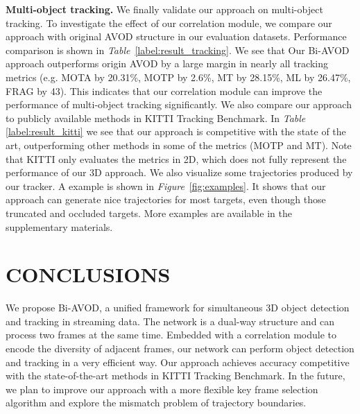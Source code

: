 \documentclass[letterpaper, 10 pt, conference]{ieeeconf}  %
\def\figurename{\emph{Figure}}
\def\tablename{\emph{Table}}
\begin{document}
\textbf{Multi-object tracking.} We finally validate our approach on multi-object tracking. To investigate the effect of our correlation module, we compare our approach with original AVOD structure in our evaluation datasets. Performance comparison is shown in  \tablename \, \ref{label:result_tracking}. We see that Our Bi-AVOD approach outperforms origin AVOD by a large margin in nearly all tracking metrics (e.g. MOTA by 20.31\%, MOTP by 2.6\%, MT by 28.15\%, ML by 26.47\%, FRAG by 43). This indicates that our correlation module can improve the performance of multi-object tracking significantly. We also compare our approach to publicly available methods in KITTI Tracking Benchmark. In \tablename \, \ref{label:result_kitti} we see that our approach is competitive with the state of the art, outperforming other methods in some of the metrics (MOTP and MT). Note that KITTI only evaluates the metrics in 2D, which does not fully represent the performance of our 3D approach.
We also visualize some trajectories produced by our tracker. A example is shown in \figurename \, \ref{fig:examples}. It shows that our approach can generate nice trajectories for most targets, even though those truncated and occluded targets. More examples are available in the supplementary materials. 


\section{CONCLUSIONS}

\label{sec:conclusions} We propose Bi-AVOD, a unified framework for simultaneous 3D object detection and tracking in streaming data. The network is a dual-way structure and can  process two frames at the same time. Embedded with a correlation module to encode the diversity of adjacent frames, our network can perform object detection and tracking in a very efficient way. Our approach achieves accuracy competitive with the state-of-the-art methods in KITTI Tracking Benchmark. In the future, we plan to improve our approach with a more flexible key frame selection algorithm and explore the mismatch problem of trajectory boundaries.




\end{document}
